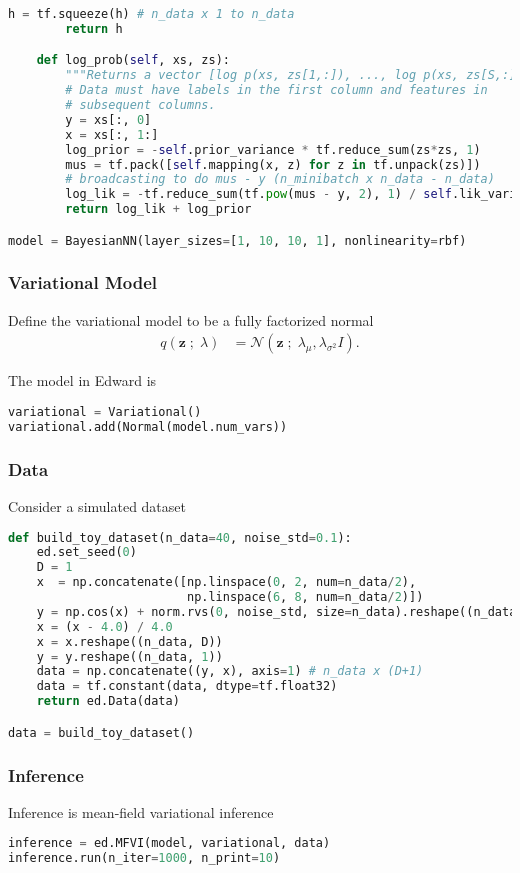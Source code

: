 \begin{lstlisting}[language=Python]
        h = tf.squeeze(h) # n_data x 1 to n_data
        return h

    def log_prob(self, xs, zs):
        """Returns a vector [log p(xs, zs[1,:]), ..., log p(xs, zs[S,:])]."""
        # Data must have labels in the first column and features in
        # subsequent columns.
        y = xs[:, 0]
        x = xs[:, 1:]
        log_prior = -self.prior_variance * tf.reduce_sum(zs*zs, 1)
        mus = tf.pack([self.mapping(x, z) for z in tf.unpack(zs)])
        # broadcasting to do mus - y (n_minibatch x n_data - n_data)
        log_lik = -tf.reduce_sum(tf.pow(mus - y, 2), 1) / self.lik_variance
        return log_lik + log_prior

model = BayesianNN(layer_sizes=[1, 10, 10, 1], nonlinearity=rbf)
\end{lstlisting}

\subsubsection{Variational Model}
Define the variational model to be a fully factorized normal
\begin{align*}
  q(\mathbf{z} \;;\; \lambda)
  &=
  \mathcal{N}(\mathbf{z} \;;\; \lambda_\mu, \lambda_{\sigma^2} I).
\end{align*}

The model in Edward is
\begin{lstlisting}[language=Python]
variational = Variational()
variational.add(Normal(model.num_vars))
\end{lstlisting}


\subsubsection{Data}

Consider a simulated dataset
\begin{lstlisting}[language=Python]
def build_toy_dataset(n_data=40, noise_std=0.1):
    ed.set_seed(0)
    D = 1
    x  = np.concatenate([np.linspace(0, 2, num=n_data/2),
                         np.linspace(6, 8, num=n_data/2)])
    y = np.cos(x) + norm.rvs(0, noise_std, size=n_data).reshape((n_data,))
    x = (x - 4.0) / 4.0
    x = x.reshape((n_data, D))
    y = y.reshape((n_data, 1))
    data = np.concatenate((y, x), axis=1) # n_data x (D+1)
    data = tf.constant(data, dtype=tf.float32)
    return ed.Data(data)

data = build_toy_dataset()
\end{lstlisting}


\subsubsection{Inference}

Inference is mean-field variational inference
\begin{lstlisting}[language=Python]
inference = ed.MFVI(model, variational, data)
inference.run(n_iter=1000, n_print=10)
\end{lstlisting}

